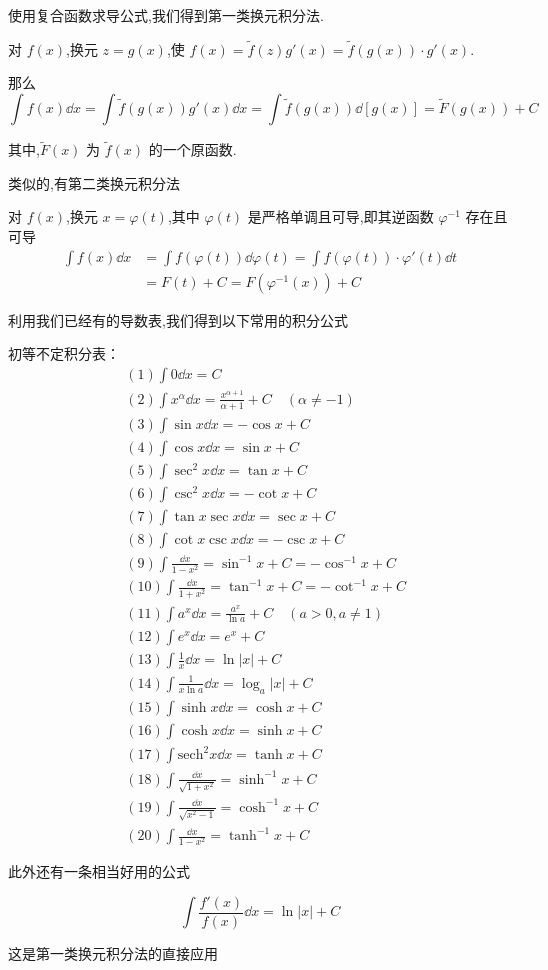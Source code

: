 使用复合函数求导公式,我们得到第一类换元积分法.
\begin{proposition}
	对 $f(x)$,换元 $z = g(x)$,使 $f(x) = \tilde{f}(z )g'(x) = \tilde{f}(g(x)) \cdot g'(x)$.
	
	那么
	\[
	\int f(x) \dd x = \int \tilde{f}(g(x)) g'(x) \dd x = \int \tilde{f}(g(x)) \dd[g(x)] = \tilde{F}(g(x)) + C
	\]
	
	其中,$\tilde{F}(x)$ 为 $\tilde{f}(x)$ 的一个原函数.
\end{proposition}
类似的,有第二类换元积分法
\begin{proposition}
	对 $f(x)$,换元 $x = \varphi(t)$,其中 $\varphi(t)$ 是严格单调且可导,即其逆函数 $\varphi^{-1}$ 存在且可导
	\[\begin{aligned}
		\int f(x) \dd x &= \int f(\varphi(t)) \dd\varphi(t) = \int f(\varphi(t)) \cdot \varphi'(t) \dd t\\
		&= F(t) + C = F(\varphi^{-1}(x)) + C
	\end{aligned}\]
	
\end{proposition}\newpage
利用我们已经有的导数表,我们得到以下常用的积分公式
\begin{proposition}
	初等不定积分表：
	\[\begin{aligned}
		&(1)\int 0 \dd x = C\\
		&(2) \int x^\alpha \dd x = \frac{x^{\alpha+1}}{\alpha+1} + C \quad (\alpha \neq -1)\\
		&(3)\int \sin x \dd x = -\cos x + C\\
		&(4)\int \cos x \dd x = \sin x + C\\
		&(5)\int \sec^2 x \dd x = \tan x + C\\
		&(6)\int \csc^2 x \dd x = -\cot x + C\\
		&(7)\int \tan x \sec x \dd x = \sec x + C\\
		&(8)\int \cot x \csc x \dd x = -\csc x + C\\
		&(9)\int \frac{\dd x}{1-x^2} = \sin^{-1} x + C = -\cos^{-1} x + C\\
		&(10)\int \frac{\dd x}{1+x^2} = \tan^{-1} x + C = -\cot^{-1} x + C\\
		& (11) \int a^x \dd x = \frac{a^x}{\ln a} + C \quad (a > 0, a \neq 1)\\
		&(12) \int e^x \dd x = e^x + C\\
		&(13)\int \frac{1}{x} \dd x = \ln |x| + C\\
		&(14)\int \frac{1}{x \ln a} \dd x = \log_a |x| + C\\
		&(15)\int \sinh x \dd x = \cosh x + C\\
		&(16)\int \cosh x \dd x = \sinh x + C\\
		&(17)\int \text{sech}^2 x \dd x = \tanh x + C\\
		&(18)\int \frac{\dd x}{\sqrt{1+x^2}} = \sinh^{-1} x + C\\
		&(19)\int \frac{\dd x}{\sqrt{x^2-1}} = \cosh^{-1} x + C\\
		&(20)\int \frac{\dd x}{1-x^2} = \tanh^{-1} x + C
	\end{aligned}\]
\end{proposition}
此外还有一条相当好用的公式
\begin{proposition}
	\[\int\dfrac{f'(x)}{f(x)}\dd x=\ln|x|+C\]
\end{proposition}
这是第一类换元积分法的直接应用
